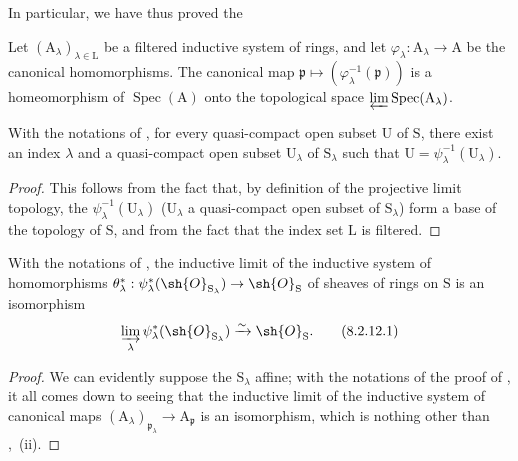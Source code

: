In particular, we have thus proved the

\begin{corollary}[8.2.10]
\label{IV.8.2.10}
Let $(\mathrm{A}_\lambda)_{\lambda\in\mathrm{L}}$ be a filtered inductive system of rings, and let $\varphi_\lambda:\mathrm{A}_\lambda\to\mathrm{A}$ be the canonical homomorphisms.
The canonical map $\mathfrak{p}\mapsto(\varphi_\lambda^{-1}(\mathfrak{p}))$ is a homeomorphism of $\operatorname{Spec}(\mathrm{A})$ onto the topological space $\varprojlim\operatorname{Spec}(\mathrm{A}_\lambda)$.
\end{corollary}

\begin{corollary}[8.2.11]
\label{IV.8.2.11}
With the notations of , for every quasi-compact open subset $\mathrm{U}$ of $\mathrm{S}$, there exist an index $\lambda$ and a quasi-compact open subset $\mathrm{U}_\lambda$ of $\mathrm{S}_\lambda$ such that $\mathrm{U}=\psi_\lambda^{-1}(\mathrm{U}_\lambda)$.
\end{corollary}

\begin{proof}
This follows from the fact that, by definition of the projective limit topology, the $\psi_\lambda^{-1}(\mathrm{U}_\lambda)$ ($\mathrm{U}_\lambda$ a quasi-compact open subset of $\mathrm{S}_\lambda$) form a base of the topology of $\mathrm{S}$, and from the fact that the index set $\mathrm{L}$ is filtered.
\end{proof}

\begin{corollary}[8.2.12]
\label{IV.8.2.12}
With the notations of , the inductive limit of the inductive system of homomorphisms $\theta_\lambda^*:\psi_\lambda^*(\sh{O}_{\mathrm{S}_\lambda})\to\sh{O}_\mathrm{S}$ of sheaves of rings on $\mathrm{S}$ is an isomorphism
\begin{equation}
  \varinjlim_\lambda\psi_\lambda^*(\sh{O}_{\mathrm{S}_\lambda})\xrightarrow{\sim}\sh{O}_\mathrm{S}.
  \tag{8.2.12.1}
\end{equation}
\end{corollary}

\begin{proof}
We can evidently suppose the $\mathrm{S}_\lambda$ affine; with the notations of the proof of , it all comes down to seeing that the inductive limit of the inductive system of canonical maps $(\mathrm{A}_\lambda)_{\mathfrak{p}_\lambda}\to\mathrm{A}_\mathfrak{p}$ is an isomorphism, which is nothing other than ,~(ii).
\end{proof}

